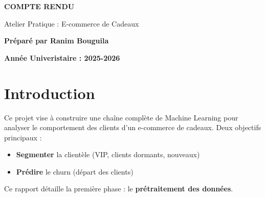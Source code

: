 \documentclass[11pt,a4paper]{article}
\begin{document}
\begin{titlepage}

\vspace{6cm}

\begin{center}
{\LARGE\textbf{COMPTE RENDU}}\par
\vspace{1cm}
{\large Atelier Pratique : E-commerce de Cadeaux}\par
\vspace{2cm}
{\large \textbf{Préparé par Ranim Bouguila}}
\vspace{3cm}


\vspace{2cm}



\vspace{5cm}

{\textbf{Année Univeristaire : 2025-2026}}

\end{center}
\vfill
\end{titlepage}

\tableofcontents
\newpage

\listoffigures
\newpage

\listoftables
\newpage

\section{Introduction}
Ce projet vise à construire une chaîne complète de Machine Learning pour analyser le comportement des clients d'un e-commerce de cadeaux. Deux objectifs principaux :
\begin{itemize}
	\item \textbf{Segmenter} la clientèle (VIP, clients dormants, nouveaux)
	\item \textbf{Prédire} le churn (départ des clients)
\end{itemize}
Ce rapport détaille la première phase : le \textbf{prétraitement des données}.
\end{document}
